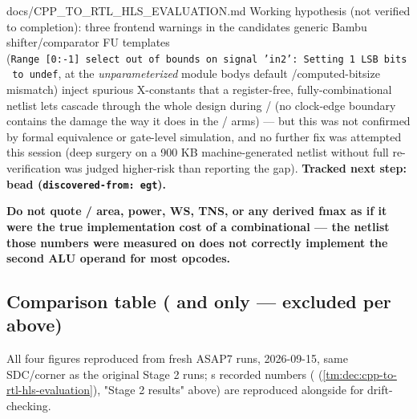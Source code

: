 \begin{relocated}{docs/CPP_TO_RTL_HLS_EVALUATION.md}
Working hypothesis (not verified to completion): three
 frontend warnings in the candidate\textquotesingle s
generic Bambu shifter/\allowbreak{}comparator FU templates
(\texttt{Range\ [0:\allowbreak{}-\allowbreak{}1]\ select\ out\ of\ bounds\ on\ signal\ 'in2':\allowbreak{}\ Setting\ 1\ LSB\ bits\ to\ undef},
at the \emph{unparameterized} module body\textquotesingle s default
/\allowbreak{}computed-bitsize mismatch) inject
spurious X-constants that a register-free, fully-combinational netlist
lets cascade through the whole design during
/ (no clock-edge boundary contains the
damage the way it does in the / arms) --- but this
was not confirmed by formal equivalence or gate-level simulation, and no
further fix was attempted this session (deep surgery on a 900 KB
machine-generated netlist without full re-verification was judged
higher-risk than reporting the gap). \textbf{Tracked next step: bead
(\texttt{discovered-\allowbreak{}from:\allowbreak{}\ egt}).}

\textbf{Do not quote / area, power, WS, TNS,
or any derived fmax as if it were the true implementation cost of a
combinational  --- the netlist those numbers were
measured on does not correctly implement the second ALU operand for most
opcodes.}

\subsection{\texorpdfstring{Comparison table ( and 
only ---  excluded per
above)}{Comparison table ( and  only ---  excluded per above)}}\label{tm:dec:cpp-to-rtl-hls-evaluation:comparison-table-rtl-and-hls-only-comb-excluded-per-above}

All four figures reproduced from fresh ASAP7 
runs, 2026-09-15, same SDC/\allowbreak{}corner as the original
 Stage 2 runs; \textquotesingle s recorded numbers
( (\cref{tm:dec:cpp-to-rtl-hls-evaluation}), "Stage 2 results" above) are
reproduced alongside for drift-checking.

{\footnotesize\setlength{\tabcolsep}{3pt}

}
\end{relocated}
